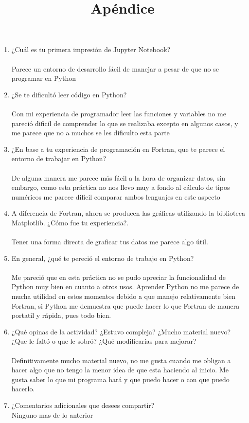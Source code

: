 \documentclass{article}
\begin{document}
\newpage

\title{Apéndice}

\begin{enumerate}
\item ¿Cuál es tu primera impresión de Jupyter Notebook? ~\\~\\
Parece un entorno de desarrollo fácil de manejar a pesar de que no se programar en Python

\item ¿Se te dificultó leer código en Python?~\\~\\
Con mi experiencia de programador leer las funciones y variables no me pareció dificil de comprender lo que se realizaba excepto en algunos casos, y me parece que no a muchos se les dificulto esta parte

\item ¿En base a tu experiencia de programación en Fortran, que te parece el entorno de trabajar en Python? ~\\~\\
De alguna manera me parece más fácil a la hora de organizar datos, sin embargo, como esta práctica no nos llevo muy a fondo al cálculo de tipos numéricos me parece dificil comparar ambos lenguajes en este aspecto

\item A diferencia de Fortran, ahora se producen las gráficas utilizando la biblioteca Matplotlib. ¿Cómo fue tu experiencia?. ~\\~\\
Tener una forma directa de graficar tus datos me parece algo útil.

\item En general, ¿qué te pereció el entorno de trabajo en Python?  ~\\~\\
Me pareció que en esta práctica no se pudo apreciar la funcionalidad de Python muy bien en cuanto a otros usos. Aprender Python no me parece de mucha utilidad en estos momentos debido a que manejo relativamente bien Fortran, si Python me demuestra que puede hacer lo que Fortran de manera portatil y rápida, pues todo bien.

\item ¿Qué opinas de la actividad? ¿Estuvo compleja? ¿Mucho material nuevo? ¿Que le faltó o que le sobró? ¿Qué modificarías para mejorar?   ~\\~\\
Definitivamente mucho material nuevo, no me gusta cuando me obligan a hacer algo que no tengo la menor idea de que esta haciendo al inicio. Me gusta saber lo que mi programa hará y que puedo hacer o con que puedo hacerlo.

\item ¿Comentarios adicionales que desees compartir? ~\\
Ninguno mas de lo anterior


\end{enumerate}
\end{document}
